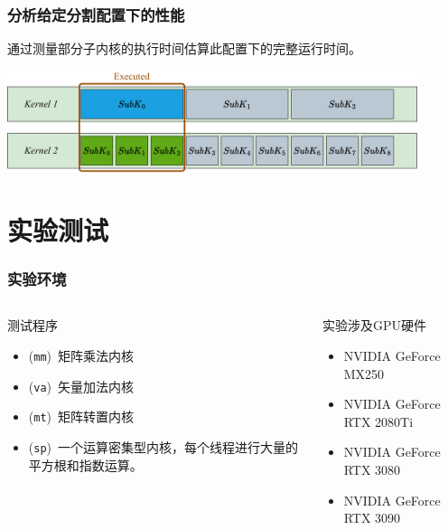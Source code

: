 \documentclass[aspectratio=169]{ctexbeamer}
\newcommand{\emptyline}{\newline\newline}
\begin{document}
\begin{frame}
  \frametitle{分析给定分割配置下的性能}
      通过测量部分子内核的执行时间估算此配置下的完整运行时间。
      \begin{center}
        \includegraphics[width=0.9\textwidth]{figures/sampling.drawio.pdf}
      \end{center}
\end{frame}

\section{实验测试}
\begin{frame}
  \frametitle{实验环境}
  \begin{columns}
    \begin{column}{0.6\textwidth}
    \large{测试程序}
      \begin{itemize}
        \item { (\texttt{mm})}\ 矩阵乘法内核
        \item { (\texttt{va})}\ 矢量加法内核
        \item { (\texttt{mt})}\ 矩阵转置内核
        \item { (\texttt{sp})}\ 一个运算密集型内核，每个线程进行大量的平方根和指数运算。
      \end{itemize}
    \end{column}
    \begin{column}{0.45\textwidth}
      \large{实验涉及GPU硬件}
      \begin{itemize}
        \item NVIDIA GeForce MX250
        \item NVIDIA GeForce RTX 2080Ti
        \item NVIDIA GeForce RTX 3080
        \item NVIDIA GeForce RTX 3090
      \end{itemize}
      \ \\
    \end{column}
  \end{columns}
\end{frame}
\end{document}

